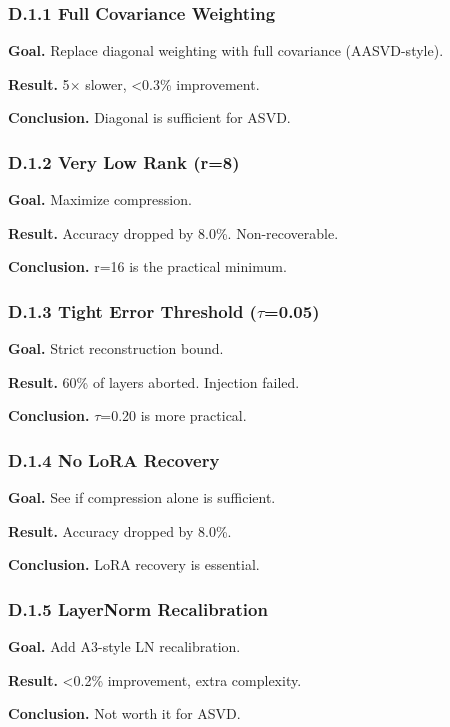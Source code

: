 \subsubsection{D.1.1 Full Covariance Weighting}

\textbf{Goal.} Replace diagonal weighting with full covariance (AASVD-style).

\textbf{Result.} 5$\times$ slower, \textless{}0.3\% improvement.

\textbf{Conclusion.} Diagonal is sufficient for ASVD.

\subsubsection{D.1.2 Very Low Rank (r=8)}

\textbf{Goal.} Maximize compression.

\textbf{Result.} Accuracy dropped by 8.0\%. Non-recoverable.

\textbf{Conclusion.} r=16 is the practical minimum.

\subsubsection{D.1.3 Tight Error Threshold ($\tau$=0.05)}

\textbf{Goal.} Strict reconstruction bound.

\textbf{Result.} 60\% of layers aborted. Injection failed.

\textbf{Conclusion.} $\tau$=0.20 is more practical.

\subsubsection{D.1.4 No LoRA Recovery}

\textbf{Goal.} See if compression alone is sufficient.

\textbf{Result.} Accuracy dropped by 8.0\%.

\textbf{Conclusion.} LoRA recovery is essential.

\subsubsection{D.1.5 LayerNorm Recalibration}

\textbf{Goal.} Add A3-style LN recalibration.

\textbf{Result.} \textless{}0.2\% improvement, extra complexity.

\textbf{Conclusion.} Not worth it for ASVD.

